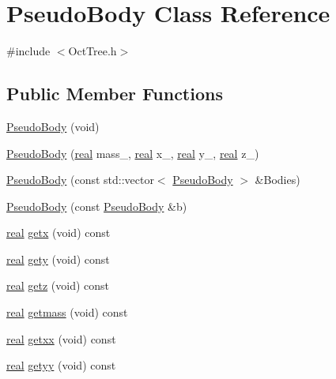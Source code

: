 \section{PseudoBody Class Reference}
\label{classPseudoBody}


{\ttfamily \#include $<$OctTree.h$>$}

\subsection*{Public Member Functions}
\begin{DoxyCompactItemize}
\item 
\hyperlink{classPseudoBody_afaa661d98d152810e0faeb52ac3913d6}{PseudoBody} (void)
\item 
\hyperlink{classPseudoBody_a0065ec4c3f863d521941255fde9b0a72}{PseudoBody} (\hyperlink{Global_8h_a031f8951175b43076c2084a6c2173410}{real} mass\_\-, \hyperlink{Global_8h_a031f8951175b43076c2084a6c2173410}{real} x\_\-, \hyperlink{Global_8h_a031f8951175b43076c2084a6c2173410}{real} y\_\-, \hyperlink{Global_8h_a031f8951175b43076c2084a6c2173410}{real} z\_\-)
\item 
\hyperlink{classPseudoBody_a5442c4ff14c3b1e3b484348add3f6567}{PseudoBody} (const std::vector$<$ \hyperlink{classPseudoBody}{PseudoBody} $>$ \&Bodies)
\item 
\hyperlink{classPseudoBody_a938fe4b894485c490d6853329e7440bb}{PseudoBody} (const \hyperlink{classPseudoBody}{PseudoBody} \&b)
\item 
\hyperlink{Global_8h_a031f8951175b43076c2084a6c2173410}{real} \hyperlink{classPseudoBody_a323d87fa3063a25ba8858f5bc024dc4e}{getx} (void) const 
\item 
\hyperlink{Global_8h_a031f8951175b43076c2084a6c2173410}{real} \hyperlink{classPseudoBody_a53002d02faf4268f27d66085482fb11d}{gety} (void) const 
\item 
\hyperlink{Global_8h_a031f8951175b43076c2084a6c2173410}{real} \hyperlink{classPseudoBody_aa6f0b3f36e44110c323ef5d0e5e86bbe}{getz} (void) const 
\item 
\hyperlink{Global_8h_a031f8951175b43076c2084a6c2173410}{real} \hyperlink{classPseudoBody_ace7f2a17a0d75e2bf822cd5223d997fe}{getmass} (void) const 
\item 
\hyperlink{Global_8h_a031f8951175b43076c2084a6c2173410}{real} \hyperlink{classPseudoBody_adea161238936ce49799d5f7f44676b03}{getxx} (void) const 
\item 
\hyperlink{Global_8h_a031f8951175b43076c2084a6c2173410}{real} \hyperlink{classPseudoBody_a991d2e4368d7e218ebdb21bf3bfc9cc0}{getyy} (void) const 

\end{DoxyCompactItemize}
